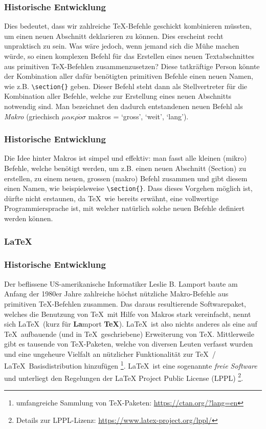 \begin{frame}[fragile]
\frametitle{Historische Entwicklung}
Dies bedeutet, dass wir zahlreiche \TeX-Befehle geschickt kombinieren müssten, um einen neuen Abschnitt deklarieren zu können. Dies erscheint recht unpraktisch zu sein. Was wäre jedoch, wenn jemand sich die Mühe machen würde, so einen komplexen Befehl für das Erstellen eines neuen Textabschnittes aus primitiven \TeX-Befehlen zusammenzusetzen? Diese tatkräftige Person könnte der Kombination aller dafür benötigten primitiven Befehle einen neuen Namen, wie z.B. \lstinline[style=LaTeX]|\section{}| geben. Dieser Befehl steht dann als Stellvertreter für die Kombination aller Befehle, welche zur Erstellung eines neuen Abschnitts notwendig sind. Man bezeichnet den dadurch entstandenen neuen Befehl als \textit{Makro} (griechisch $\mu\alpha\kappa\rho\acute{o}\sigma$ makros = `gross', `weit', `lang').
\end{frame}


\begin{frame}[fragile]
\frametitle{Historische Entwicklung}
Die Idee hinter Makros ist simpel und effektiv: man fasst alle kleinen (mikro) Befehle, welche benötigt werden, um z.B. einen neuen Abschnitt (Section) zu erstellen, zu einem neuen, grossen (makro) Befehl zusammen und gibt diesem einen Namen, wie beispielsweise \lstinline[style=LaTeX]|\section{}|. Dass dieses Vorgehen möglich ist, dürfte nicht erstaunen, da \TeX\, wie bereits erwähnt, eine vollwertige Programmiersprache ist, mit welcher natürlich solche neuen Befehle definiert werden können.
\subsubsection{\LaTeX}
\end{frame}


\begin{frame}[fragile]
\frametitle{Historische Entwicklung}
Der beflissene US-amerikanische Informatiker Leslie B. Lamport baute am Anfang der 1980er Jahre zahlreiche höchst nützliche Makro-Befehle aus primitiven \TeX-Befehlen zusammen. Das daraus resultierende Softwarepaket, welches die Benutzung von \TeX\ mit Hilfe von Makros stark vereinfacht, nennt sich \LaTeX\ (kurz für \textbf{La}mport \textbf{TeX}). \LaTeX\ ist also nichts anderes als eine auf \TeX\ aufbauende (und in \TeX\ geschriebene) Erweiterung von \TeX. Mittlerweile gibt es tausende von \TeX-Paketen, welche von diversen Leuten verfasst wurden und eine ungeheure Vielfalt an nützlicher Funktionalität zur \TeX\ / \LaTeX\ Basisdistribution
hinzufügen \footnote{umfangreiche Sammlung von \TeX-Paketen: \url{https://ctan.org/?lang=en}}. \LaTeX\ ist eine sogenannte \textit{freie Software} und unterliegt den Regelungen der LaTeX Project Public License (LPPL) \footnote{Details zur LPPL-Lizenz: \url{https://www.latex-project.org/lppl/}}.
\end{frame}


